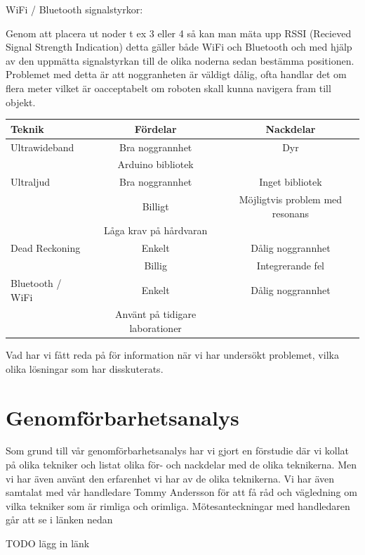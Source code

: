 \documentclass[11pt, a4paper]{report}
\begin{document}
WiFi / Bluetooth signalstyrkor:

Genom att placera ut noder t ex 3 eller 4 så kan man mäta upp RSSI (Recieved Signal Strength Indication) detta gäller både WiFi och Bluetooth och med hjälp av den uppmätta signalstyrkan till de olika noderna sedan bestämma positionen. Problemet med detta är att noggranheten är väldigt dålig, ofta handlar det om flera meter vilket är oacceptabelt om roboten skall kunna navigera fram till objekt.

\begin{center}
     \begin{tabular}{l | c | c}
  		Teknik & Fördelar & Nackdelar \\ \hline
        Ultrawideband & Bra noggrannhet & Dyr\\
         & Arduino bibliotek \\ \hline
        Ultraljud & Bra noggrannhet & Inget bibliotek\\
        & Billigt & Möjligtvis problem med resonans\\
        & Låga krav på hårdvaran \\ \hline
        Dead Reckoning & Enkelt & Dålig noggrannhet \\
        & Billig & Integrerande fel \\ \hline
        Bluetooth / WiFi & Enkelt & Dålig noggrannhet \\
        & Använt på tidigare laborationer
  \end{tabular}
  \end{center}


Vad har vi fått reda på för information när vi har undersökt problemet, vilka olika lösningar som har disskuterats. 

\cleardoublepage

\section{Genomförbarhetsanalys}

Som grund till vår genomförbarhetsanalys har vi gjort en förstudie där vi kollat på olika tekniker och listat olika för- och nackdelar med de olika teknikerna. Men vi har även använt den erfarenhet vi har av de olika teknikerna. Vi har även samtalat med vår handledare Tommy Andersson för att få råd och vägledning om vilka tekniker som är rimliga och orimliga. Mötesanteckningar med handledaren går att se i länken nedan

TODO lägg in länk
\end{document}
